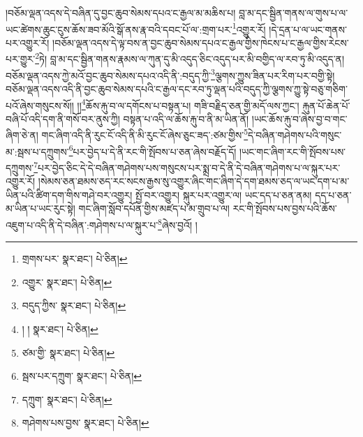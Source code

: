 །བཅོམ་ལྡན་འདས་དེ་བཞིན་དུ་བྱང་ཆུབ་སེམས་དཔའ་ང་རྒྱལ་མ་མཆིས་པ། བླ་མ་དང་སྦྱིན་གནས་ལ་གུས་པ་ལ་ཡང་ཚེགས་ཆུང་ངུས་ཆོས་ཟབ་མོའི་སྒོ་ནས་རྣ་བའི་དབང་པོ་ལ་:གྲག་པར་\footnote{གྲགས་པར་  སྣར་ཐང་།  པེ་ཅིན། }འགྱུར་རོ། །དེ་དྲན་པ་ལ་ཡང་གནས་པར་འགྱུར་རོ། །བཅོམ་ལྡན་འདས་དེ་ལྟ་བས་ན་བྱང་ཆུབ་སེམས་དཔའ་ང་རྒྱལ་གྱིས་ཁེངས་པ་ང་རྒྱལ་གྱིས་རེངས་པར་གྱུར་\footnote{འགྱུར་  སྣར་ཐང་།  པེ་ཅིན། }ཏེ། བླ་མ་དང་སྦྱིན་གནས་རྣམས་ལ་ཀུན་དུ་མི་འདུད་ཅིང་འདུད་པར་མི་བགྱིད་ལ་རབ་ཏུ་མི་འདུད་ན། བཅོམ་ལྡན་འདས་ཀྱེ་མའོ་བྱང་ཆུབ་སེམས་དཔའ་འདི་ནི་:བདུད་ཀྱི་\footnote{བདུད་ཀྱིས་  སྣར་ཐང་།  པེ་ཅིན། }ལྕགས་ཀྱུས་ཟིན་པར་རིག་པར་བགྱི་སྟེ། བཅོམ་ལྡན་འདས་འདི་ནི་བྱང་ཆུབ་སེམས་དཔའི་ང་རྒྱལ་དང་རབ་ཏུ་ལྡན་པའི་བདུད་ཀྱི་ལྕགས་ཀྱུ་སྟེ་བཅུ་གཅིག་པའོ་ཞེས་གསུངས་སོ།། །།\footnote{། །  སྣར་ཐང་།  པེ་ཅིན། }ཆོས་རྐུ་བ་ལ་དགོངས་པ་བསྟན་པ། གཟི་བརྗིད་ཅན་གྱི་མདོ་ལས་ཀྱང་། རྐུན་པོ་ཆེན་པོ་བཞི་པོ་འདི་དག་ནི་གསོ་བར་ནུས་ཀྱི། བསྟན་པ་འདི་ལ་ཆོས་རྐུ་བ་ནི་མ་ཡིན་ནོ། །ཡང་ཆོས་རྐུ་བ་ཞེས་བྱ་བ་གང་ཞིག་ཅེ་ན། གང་ཞིག་འདི་ནི་རུང་ངོ་འདི་ནི་མི་རུང་ངོ་ཞེས་ཅུང་ཟད་:ཙམ་གྱིས་\footnote{ཙམ་གྱི་  སྣར་ཐང་།  པེ་ཅིན། }དེ་བཞིན་གཤེགས་པའི་གསུང་མ་:སྦས་པ་དཀྲུགས་\footnote{སྦས་པར་དཀྲུག་  སྣར་ཐང་།  པེ་ཅིན། }པར་བྱེད་པ་དེ་ནི་རང་གི་སྤོབས་པ་ཅན་ཞེས་བརྗོད་དོ། །ཡང་གང་ཞིག་རང་གི་སྤོབས་པས་དཀྲུགས་\footnote{དཀྲུག་  སྣར་ཐང་།  པེ་ཅིན། }པར་བྱེད་ཅིང་དེ་དེ་བཞིན་གཤེགས་པས་གསུངས་པར་སྨྲ་བ་དེ་ནི་དེ་བཞིན་གཤེགས་པ་ལ་སྐུར་པར་འགྱུར་རོ། །སེམས་ཅན་ཐམས་ཅད་རང་སངས་རྒྱས་སུ་འགྱུར་ཞིང་གང་ཞིག་དེ་དག་ཐམས་ཅད་ལ་ཡང་དག་པ་མ་ཡིན་པའི་ཚིག་དག་གིས་གཤེ་བར་འགྱུར། སྤྱོ་བར་འགྱུར། སྐུར་པར་འགྱུར་ལ། ཡང་དད་པ་ཅན་ནམ། དད་པ་ཅན་མ་ཡིན་པ་ཡང་རུང་སྟེ། གང་ཞིག་སློབ་དཔོན་གྱིས་མཛད་པ་མ་གྲུབ་པ་ལ། རང་གི་སྤོབས་པས་བྱས་པའི་ཆོས་འཇུག་པ་འདི་ནི་དེ་བཞིན་:གཤེགས་པ་ལ་སྐུར་པ་\footnote{གཤེགས་པས་བྱས་  སྣར་ཐང་།  པེ་ཅིན། }ཞེས་བྱའོ། །
